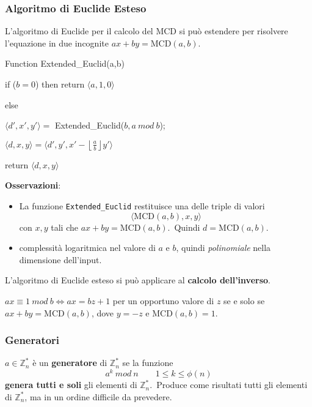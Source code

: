 \subsubsection{Algoritmo di Euclide Esteso}

L'algoritmo di Euclide per il calcolo del MCD si può estendere per risolvere l'equazione in due incognite $ax+by=\mathrm{MCD}(a,b)$.\

\begin{flushleft}
    \ttfamily
    Function Extended\_Euclid(a,b)

    \quad if ($b=0$) then return $\langle a, 1, 0\rangle$

    \quad else

    \qquad $\langle d', x', y' \rangle = $ Extended\_Euclid($b, a\ \mathit{mod}\ b$);

    \qquad $\langle d, x, y \rangle = \langle d', y', x' - \left\lfloor \frac{a}{b}\right\rfloor y' \rangle$

    \qquad return $\langle d, x, y\rangle$
\end{flushleft}

\noindent \textbf{Osservazioni}:\

\begin{itemize}
    \item La funzione \texttt{Extended\_Euclid} restituisce una delle triple di valori \[\langle\mathrm{MCD} (a, b), x, y\rangle\] con $x,y$ tali che $ax + by = \mathrm{MCD}(a,b)$.\ Quindi $d = \mathrm{MCD}(a,b)$.\
    \item complessità logaritmica nel valore di $a$ e $b$, quindi \textit{polinomiale} nella dimensione dell'input.\
\end{itemize}

\noindent L'algoritmo di Euclide esteso si può applicare al \textbf{calcolo dell'inverso}.\

$ax \equiv 1\ \mathit{mod}\ b \Leftrightarrow ax = bz + 1$ per un opportuno valore di $z$ se e solo se $ax +by = \mathrm{MCD}(a,b)$, dove $y =-z$ e $\mathrm{MCD}(a,b) =1$.\

\subsubsection{Generatori}

$a \in \mathbb{Z}_n^*$ è un \textbf{generatore} di $\mathbb{Z}_n^*$ se la funzione
\[a^k\ \mathit{mod}\ n\qquad 1 \leq k \leq \phi(n)\]
\textbf{genera tutti e soli} gli elementi di $\mathbb{Z}_n^*$.\
Produce come risultati tutti gli elementi di $\mathbb{Z}_n^*$, ma in un ordine difficile da prevedere.\

